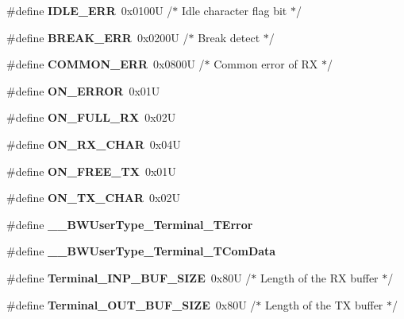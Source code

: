 \begin{DoxyCompactItemize}
\#define {\bfseries I\+D\+L\+E\+\_\+\+E\+RR}~0x0100\+U       /$\ast$ Idle character flag bit   $\ast$/
\item 
\mbox{\label{group___terminal__module_ga0cb4d61ee3347eb62142ca0eb1d02a53}} 
\#define {\bfseries B\+R\+E\+A\+K\+\_\+\+E\+RR}~0x0200\+U       /$\ast$ Break detect              $\ast$/
\item 
\mbox{\label{group___terminal__module_ga86e7d2a6a6227d9fbb84d459454c2359}} 
\#define {\bfseries C\+O\+M\+M\+O\+N\+\_\+\+E\+RR}~0x0800\+U       /$\ast$ Common error of R\+X       $\ast$/
\item 
\mbox{\label{group___terminal__module_gab5034f048fef6a41e7901a4e34368f3d}} 
\#define {\bfseries O\+N\+\_\+\+E\+R\+R\+OR}~0x01U
\item 
\mbox{\label{group___terminal__module_ga2cf6b6a2b8c83f7d1d7e6134c6bd9a4a}} 
\#define {\bfseries O\+N\+\_\+\+F\+U\+L\+L\+\_\+\+RX}~0x02U
\item 
\mbox{\label{group___terminal__module_gad07f43952e300ba1e45521ce777c09d4}} 
\#define {\bfseries O\+N\+\_\+\+R\+X\+\_\+\+C\+H\+AR}~0x04U
\item 
\mbox{\label{group___terminal__module_ga71d35387335972e4f6ae07ecccf27724}} 
\#define {\bfseries O\+N\+\_\+\+F\+R\+E\+E\+\_\+\+TX}~0x01U
\item 
\mbox{\label{group___terminal__module_gaf02aa8bfc7e9b5338168db9ff9077c0d}} 
\#define {\bfseries O\+N\+\_\+\+T\+X\+\_\+\+C\+H\+AR}~0x02U
\item 
\mbox{\label{group___terminal__module_ga8ce9318cf24ce328e3b6bfd8c9ebf8a0}} 
\#define {\bfseries \+\_\+\+\_\+\+B\+W\+User\+Type\+\_\+\+Terminal\+\_\+\+T\+Error}
\item 
\mbox{\label{group___terminal__module_ga7ecc4a980fd46647a53c9885bf834bc7}} 
\#define {\bfseries \+\_\+\+\_\+\+B\+W\+User\+Type\+\_\+\+Terminal\+\_\+\+T\+Com\+Data}
\item 
\mbox{\label{group___terminal__module_ga0b2397603821d8408bf6f99d03ca176f}} 
\#define {\bfseries Terminal\+\_\+\+I\+N\+P\+\_\+\+B\+U\+F\+\_\+\+S\+I\+ZE}~0x80\+U   /$\ast$ Length of the R\+X buffer $\ast$/
\item 
\mbox{\label{group___terminal__module_ga93f2ed3601603d04f837bebf113a12a6}} 
\#define {\bfseries Terminal\+\_\+\+O\+U\+T\+\_\+\+B\+U\+F\+\_\+\+S\+I\+ZE}~0x80\+U   /$\ast$ Length of the T\+X buffer $\ast$/
\end{DoxyCompactItemize}
